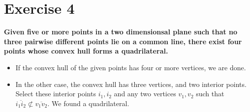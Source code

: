 \documentclass{article}
\begin{document}
\section*{Exercise 4}
\textbf{Given five or more points in a two dimensionsal plane such that no three pairwise different points lie on a common line, there exist four points whose convex hull forms a quadrilateral.}

\begin{itemize}
    \item If the convex hull of the given points has four or more vertices, we are done.
    \item In the other case, the convex hull has three vertices, and two interior points. Select these interior points $i_1, i_2$ and any two vertices $v_1,v_2$ such that $\overline{i_1 i_2} \not \subset \overline{v_1 v_2}$. We found a quadrilateral.
\end{itemize}
\end{document}
